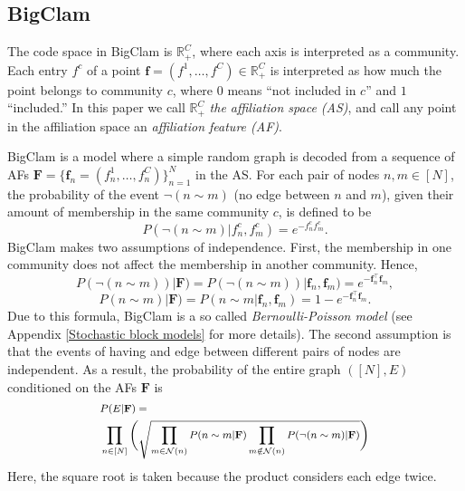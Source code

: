 \documentclass[letterpaper]{article} %
\begin{document}


\subsection{BigClam}
\label{sec:BigClam}

 The code space in BigClam is $\mathbb{R}_+^C$, where each axis is interpreted as a community.  Each entry $f^c$ of a point $\mathbf{f}=(f^1,\ldots,f^C)\in\mathbb{R}_+^C$ is interpreted as how much the point belongs to community $c$, where $0$ means ``not included in $c$'' and $1$ ``included.'' In this paper we  call $\mathbb{R}_+^C$ \emph{the affiliation space (AS)}, and call any point in the affiliation space an \emph{affiliation feature (AF)}.

BigClam is a model where a simple random graph is decoded from a sequence of AFs $\mathbf{F}= \{\mathbf{f}_n=(f_n^1,\ldots,f_n^C)\}_{n=1}^N$ in the AS. For each pair of nodes $n,m\in[N]$, the probability of the event $\neg (n\sim m)$ (no edge between $n$ and $m$), given their amount of membership in the same community $c$, is defined to be
\[
P(\neg (n\sim m)|f^c_n, f^c_m) = e^{-f^c_n f^c_m}.
\]
BigClam makes two assumptions of independence. First, the membership in one community does not affect the membership in another community. Hence,
\begin{equation}
\label{eq:ClamEdge}
    P(\neg (n\sim m))|\mathbf{F})=P(\neg (n\sim m))|\mathbf{f}_n, \mathbf{f}_m)=e^{-\mathbf{f}_n^{\top }\mathbf{f}_m},
\end{equation}
\[P(n\sim m)|\mathbf{F})=P(n\sim m|\mathbf{f}_n, \mathbf{f}_m)=1-e^{-\mathbf{f}_n^{\top }\mathbf{f}_m}.\]
Due to this formula, BigClam is a so called \emph{Bernoulli-Poisson model} 
(see Appendix \ref{Stochastic block models}  for more details).
The second assumption is that the events of having and edge between different pairs of nodes are independent.  As a result, the probability of the entire graph $([N],E)$ conditioned on the AFs $\mathbf{F}$ is
\begingroup
\begin{equation}
\footnotesize
\begin{aligned}
   &  P(E|\mathbf{F}) =\\
   &  \prod_{n \in [N]}\Bigg(
        \sqrt{\prod_{m \in \mathcal{N}(n)}P( n\sim m|\mathbf{F})\prod_{m \notin \mathcal{N}(n)} P(\neg (n\sim m)|\mathbf{F})}\Bigg)
\end{aligned}
\label{eqn:clam_prob}
\end{equation}
\endgroup
Here, the square root is taken because the product considers each edge twice. 
\end{document}
